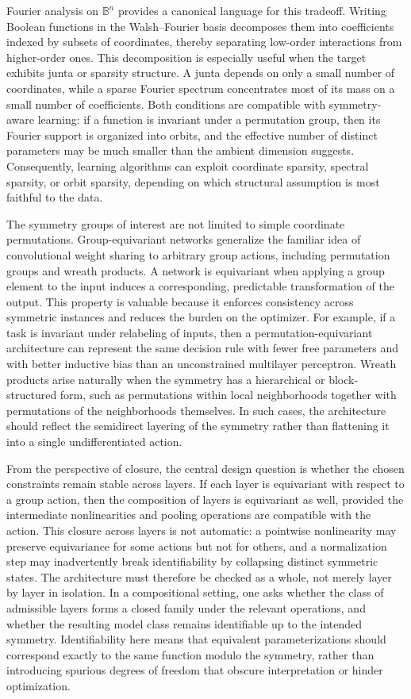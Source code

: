 \documentclass[11pt]{article}
\begin{document}
Fourier analysis on \(\mathbb{B}^n\) provides a canonical language for this tradeoff. Writing Boolean functions in the Walsh--Fourier basis decomposes them into coefficients indexed by subsets of coordinates, thereby separating low-order interactions from higher-order ones. This decomposition is especially useful when the target exhibits junta or sparsity structure. A junta depends on only a small number of coordinates, while a sparse Fourier spectrum concentrates most of its mass on a small number of coefficients. Both conditions are compatible with symmetry-aware learning: if a function is invariant under a permutation group, then its Fourier support is organized into orbits, and the effective number of distinct parameters may be much smaller than the ambient dimension suggests. Consequently, learning algorithms can exploit coordinate sparsity, spectral sparsity, or orbit sparsity, depending on which structural assumption is most faithful to the data.

The symmetry groups of interest are not limited to simple coordinate permutations. Group-equivariant networks generalize the familiar idea of convolutional weight sharing to arbitrary group actions, including permutation groups and wreath products. A network is equivariant when applying a group element to the input induces a corresponding, predictable transformation of the output. This property is valuable because it enforces consistency across symmetric instances and reduces the burden on the optimizer. For example, if a task is invariant under relabeling of inputs, then a permutation-equivariant architecture can represent the same decision rule with fewer free parameters and with better inductive bias than an unconstrained multilayer perceptron. Wreath products arise naturally when the symmetry has a hierarchical or block-structured form, such as permutations within local neighborhoods together with permutations of the neighborhoods themselves. In such cases, the architecture should reflect the semidirect layering of the symmetry rather than flattening it into a single undifferentiated action.

From the perspective of closure, the central design question is whether the chosen constraints remain stable across layers. If each layer is equivariant with respect to a group action, then the composition of layers is equivariant as well, provided the intermediate nonlinearities and pooling operations are compatible with the action. This closure across layers is not automatic: a pointwise nonlinearity may preserve equivariance for some actions but not for others, and a normalization step may inadvertently break identifiability by collapsing distinct symmetric states. The architecture must therefore be checked as a whole, not merely layer by layer in isolation. In a compositional setting, one asks whether the class of admissible layers forms a closed family under the relevant operations, and whether the resulting model class remains identifiable up to the intended symmetry. Identifiability here means that equivalent parameterizations should correspond exactly to the same function modulo the symmetry, rather than introducing spurious degrees of freedom that obscure interpretation or hinder optimization.
\end{document}
